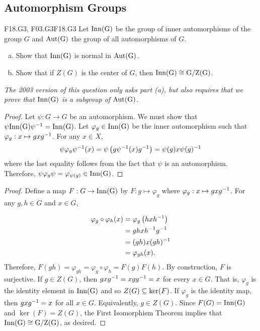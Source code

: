 \documentclass[../AlgebraQualSolutions.tex]{subfiles}
\begin{document}
\subsection{Automorphism Groups}

\begin{prob}{F18.G3, F03.G3}{F18.G3}
    Let $\rm{Inn}(G)$ be the group of inner automorphisms of the group $G$ and $\rm{Aut}(G)$ the group of all automorphisms of $G$.
    \begin{enumerate}[(a)]
        \item Show that $\rm{Inn}(G)$ is normal in $\rm{Aut}(G)$.
        \item Show that if $Z(G)$ is the center of $G$, then $\rm{Inn}(G) \cong G/Z(G)$.
    \end{enumerate}
\end{prob}

\emph{The 2003 version of this question only asks part (a), but also requires that we prove that $\rm{Inn}(G)$ is a subgroup of $\rm{Aut}(G)$.}

\begin{proof}
    Let $\psi: G\to G$ be an automorphism. We must show that $\psi \rm{Inn}(G) \psi^{-1} = \rm{Inn}(G)$. Let $\varphi_g \in \rm{Inn}(G)$ be the inner automorphism such that $\varphi_g: x \mapsto gxg^{-1}$. For any $x \in X$,
            \[\psi\varphi_g\psi^{-1}(x) = \psi\left(g\psi^{-1}(x)g^{-1}\right) = \psi(g)x\psi(g)^{-1}\]
    where the last equality follows from the fact that $\psi$ is an automorphism. Therefore, $\psi\varphi_g\psi = \varphi_{\psi(g)} \in \rm{Inn}(G)$.
\end{proof}

\begin{proof}
    Define a map $F: G \to \rm{Inn}(G)$ by $F: g \mapsto \varphi_g$ where $\varphi_g: x \mapsto gxg^{-1}$. For any $g,h \in G$ and $x \in G$,

        \begin{align*}
            \varphi_g\circ\varphi_h(x) &= \varphi_g\left(hxh^{-1}\right)\\
            &= ghxh^{-1} g^{-1}\\
            &= (gh)x(gh)^{-1}\\
            &= \varphi_{gh}(x).
        \end{align*}
    Therefore, $F(gh) = \varphi_{gh} = \varphi_g\circ \varphi_h = F(g)F(h)$. By construction, $F$ is surjective. If $g \in Z(G)$, then $gxg^{-1} = xgg^{-1} = x$ for every $x \in G$. That is, $\varphi_g$ is the identity element in $\rm{Inn}(G)$ and so $Z(G) \subseteq \ker(F)$. If $\varphi_g$ is the identity map, then $gxg^{-1} = x$ for all $x \in G$. Equivalently, $g \in Z(G)$. Since $F(G) = \rm{Inn}(G)$ and $\ker(F) = Z(G)$, the First Isomorphism Theorem implies that $\rm{Inn}(G) \cong G/Z(G)$, as desired.
\end{proof}
\end{document}
